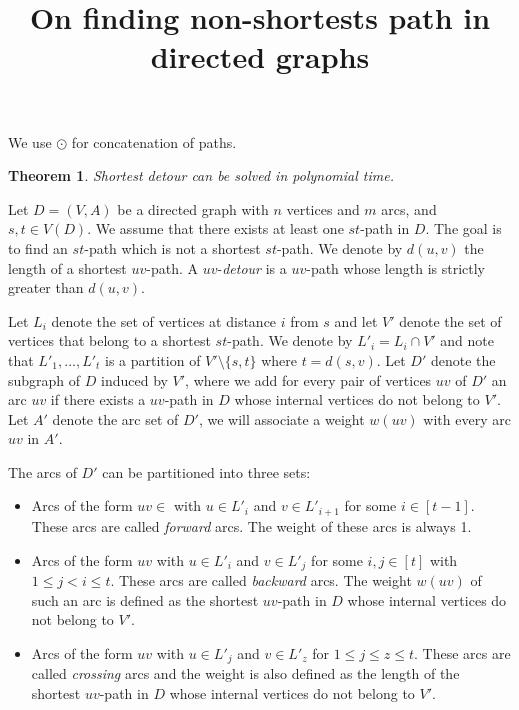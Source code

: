 \documentclass[utf8,11pt]{article}
\title{On finding non-shortests path in directed graphs}
\author{}
\date{}
\theoremstyle{plain}
\newtheorem{theorem}{Theorem}
\theoremstyle{definition}
\begin{document}
\maketitle 

We use $\odot$ for concatenation of paths.

\begin{theorem}\label{proof:main} 
   Shortest detour can be solved in polynomial time. 
\end{theorem}

Let $D = (V,A)$ be a directed graph with $n$ vertices and $m$ arcs, and $s,t \in V(D)$. We assume that there exists at least one $st$-path in $D$. The goal is to find an $st$-path which is not a shortest $st$-path. We denote by $d(u,v)$ the length of a shortest $uv$-path. A $uv$-\textit{detour} is a $uv$-path whose length is strictly greater than $d(u,v)$.

Let $L_i$ denote the set of vertices at distance $i$ from $s$ and let $V'$ denote the set of vertices that belong to a shortest $st$-path. We denote by $L'_i = L_i \cap V'$ and note that $L'_1, \dots, L'_t$ is a partition of $V' \setminus \{s,t\}$ where $t = d(s,v)$. Let $D'$ denote the subgraph of $D$ induced by $V'$, where we add for every pair of vertices $uv$ of $D'$ an arc $uv$ if there exists a $uv$-path in $D$ whose internal vertices do not belong to $V'$. Let $A'$ denote the arc set of $D'$, we will associate a weight $w(uv)$ with every arc $uv$ in $A'$. 

The arcs of $D'$ can be partitioned into three sets: 
\begin{itemize}
    \item Arcs of the form $uv \in$ with $u \in L'_{i}$ and $v \in L'_{i+1}$ for some $i \in [t-1]$. These arcs are called \textit{forward} arcs. The weight of these arcs is always 1.
    \item Arcs of the form $uv$ with $u \in L'_{i}$ and $v \in L'_{j}$ for some $i,j \in [t]$ with $1 \leq j < i \leq t$. These arcs are called \textit{backward} arcs. The weight $w(uv)$ of such an arc is defined as the shortest $uv$-path in $D$ whose internal vertices do not belong to $V'$. 
    \item Arcs of the form $uv$ with $u \in L'_{j}$ and $v \in L'_{z}$ for $1 \leq j \leq z \leq t$. These arcs are called \textit{crossing} arcs and the weight is also defined as the length of the shortest $uv$-path in $D$ whose internal vertices do not belong to $V'$.
\end{itemize}
\end{document}

